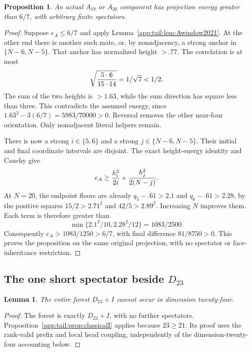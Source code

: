 \documentclass[11pt]{article}
\newtheorem{proposition}[theorem]{Proposition}
\newtheorem{lemma}[theorem]{Lemma}
\theoremstyle{definition}
\theoremstyle{remark}
\begin{document}
\begin{proposition}
\label{app:tail:prop:A19A20}
An actual $A_{19}$ or $A_{20}$ component has projection energy
greater than $6/7$, with arbitrary finite spectators.
\end{proposition}
\begin{proof}
Suppose $e_A\le6/7$ and apply
Lemma~\ref{app:tail:lem:Awindow2021}. At the other end there is another such
mate, or, by nonadjacency, a strong anchor in $\{N-6,N-5\}$.
That anchor has normalized height $>.77$. The correlation is at most
\[
 \sqrt{{5\cdot6\over15\cdot14}}=1/\sqrt7<1/2.
\]
The sum of the two heights is $>1.63$, while the sum direction
has square less than three. This contradicts the assumed energy,
since $1.63^2-3(6/7)=5983/70000>0$. Reversal removes the other
near-four orientation. Only nonadjacent literal helpers remain.

There is now a strong $i\in\{5,6\}$ and a strong
$j\in\{N-6,N-5\}$. Their initial and final coordinate intervals
are disjoint. The exact height-energy identity and Cauchy give
\[
 e_A\ge{h_i^2\over2i}+{h_j^2\over2(N-j)}.
\]
At $N=20$, the endpoint floors are already $q_5-.61>2.1$ and
$q_6-.61>2.28$, by the positive squares
$15/2>2.71^2$ and $42/5>2.89^2$. Increasing $N$ improves them.
Each term is therefore greater than
\[
 \min\{2.1^2/10,2.28^2/12\}=1083/2500.
\]
Consequently $e_A>1083/1250>6/7$, with final difference
$81/8750>0$. This proves the proposition on the same original
projection, with no spectator or face-inheritance restriction.
\end{proof}

\subsection{The one short spectator beside $D_{23}$}
\label{app:tail:D23I}
\begin{lemma}
\label{app:tail:lem:D23I}
The entire forest $D_{23}+I$ cannot occur in dimension twenty-four.
\end{lemma}
\begin{proof}
The forest is exactly $D_{23}+I$, with no further spectators.
Proposition~\ref{app:tail:prop:classicalI} applies because $23\ge21$.
Its proof uses the rank-valid prefix and local head coupling,
independently of the dimension-twenty-four accounting below.
\end{proof}
\end{document}
